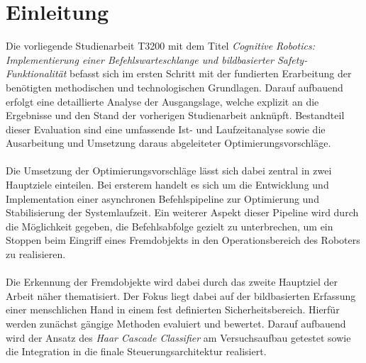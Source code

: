 
\chapter{Einleitung}
\label{Einleitung}

Die vorliegende Studienarbeit T3200 mit dem Titel \textit{Cognitive Robotics: Implementierung einer Befehlswarteschlange und bildbasierter Safety-Funktionalität} befasst sich im ersten Schritt mit der fundierten Erarbeitung der benötigten methodischen und technologischen Grundlagen. Darauf aufbauend erfolgt eine detaillierte Analyse der Ausgangslage, welche explizit an die Ergebnisse und den Stand der vorherigen Studienarbeit anknüpft. Bestandteil dieser Evaluation sind eine umfassende Ist- und Laufzeitanalyse sowie die Ausarbeitung und Umsetzung daraus abgeleiteter Optimierungsvorschläge.
\\
\\Die Umsetzung der Optimierungsvorschläge lässt sich dabei zentral in zwei Hauptziele einteilen. Bei ersterem handelt es sich um die Entwicklung und Implementation einer asynchronen Befehlspipeline zur Optimierung und Stabilisierung der Systemlaufzeit. Ein weiterer Aspekt dieser Pipeline wird durch die Möglichkeit gegeben, die Befehlsabfolge gezielt zu unterbrechen, um ein Stoppen beim Eingriff eines Fremdobjekts in den Operationsbereich des Roboters zu realisieren.
\\
\\Die Erkennung der Fremdobjekte wird dabei durch das zweite Hauptziel der Arbeit näher thematisiert. Der Fokus liegt dabei auf der bildbasierten Erfassung einer menschlichen Hand in einem fest definierten Sicherheitsbereich. Hierfür werden zunächst gängige Methoden evaluiert und bewertet. Darauf aufbauend wird der Ansatz des \textit{Haar Cascade Classifier} am Versuchsaufbau getestet sowie die Integration in die finale Steuerungsarchitektur realisiert. 

